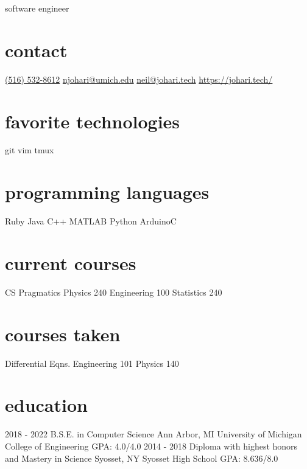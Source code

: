 \documentclass[]{friggeri-cv}
\begin{document}
{\faDesktop\hspace{.2cm} software engineer}


\begin{aside}
    \section{contact}
    \href{tel:+15165328612}{(516) 532-8612}
    \href{mailto:njohari@umich.edu}{njohari@umich.edu}
    \href{mailto:neil@johari.tech}{neil@johari.tech}
    \href{https://johari.tech/}{https://johari.tech/}
    \section{favorite technologies}
    git
    vim
    tmux
    \section{programming languages}
    Ruby
    Java 
    C++
    MATLAB
    Python
    ArduinoC
    \section{current courses}
    CS Pragmatics
    Physics 240
    Engineering 100
    Statistics 240
    \section{courses taken}
    Differential Eqns.
    Engineering 101
    Physics 140
\end{aside}

\section{education}

\begin{entrylist}
    \educationentry
    {2018 - 2022}
    {B.S.E. {\normalfont in Computer Science}}
    {Ann Arbor, MI}
    {University of Michigan College of Engineering}
    {GPA: 4.0/4.0}
    \educationentry
    {2014 - 2018}
    {Diploma {\normalfont with highest honors and Mastery in Science}}
    {Syosset, NY}
    {Syosset High School}
    {GPA: 8.636/8.0}

\end{entrylist}
\end{document}
